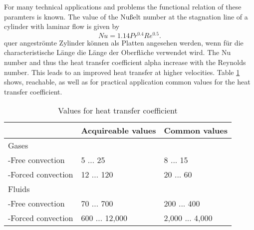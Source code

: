 For many technical applications and problems the functional relation of these paramters is known. The value of the Nußelt number at the stagnation line of a cylinder with laminar flow is given by
\begin{equation}
Nu = 1.14Pr^{0.4} Re^{0.5}. 
\end{equation}
quer angeströmte Zylinder können als Platten angesehen werden, wenn für die characteristische Länge die Länge der Oberfläche verwendet wird. The Nu number and thus the heat transfer coefficient alpha increase with the Reynolds number. This leads to an improved heat transfer at higher velocities. 
Table \ref{fig:htc_values} shows, reachable, as well as for practical application common values for the heat transfer coefficient.
\begin{table}[h]
\centering
\caption{Values for heat transfer coefficient}
\label{fig:htc_values}
\begin{tabular}{lll}
&Acquireable values&Common values\\
\hline
Gases&&\\
-Free convection&5 ... 25&8 ... 15\\
-Forced convection&12 ... 120&20 ... 60\\
Fluids&&\\
-Free convection&70 ... 700&200 ... 400\\
-Forced convection&600 ... 12,000&2,000 ... 4,000\\
\end{tabular}
\end{table}







